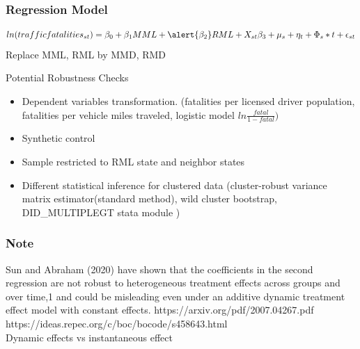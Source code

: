 \documentclass{beamer}
\begin{document}
\begin{frame}
\frametitle{Regression Model}

$$ ln(traffic fatalities_{st}) = \beta_0 + \beta_1 MML + \alert{\beta_2} RML + X_{st} \beta_3 + \mu_s + \eta_t  +\Phi_s *t +\epsilon_{st}$$
Replace MML, RML by MMD, RMD


\end{frame}

\begin{frame} {Potential Robustness Checks}
\begin{itemize}

	\item Dependent variables transformation. (fatalities per licensed driver population, fatalities per vehicle miles traveled, logistic model $ln\frac{fatal}{1- fatal} )$
	
	\item Synthetic control
	
	\item Sample restricted to RML state and neighbor states
	
	\item Different statistical inference for clustered data (cluster-robust variance matrix estimator(standard method), wild cluster bootstrap, DID\_MULTIPLEGT stata module )
\end{itemize}


\end{frame}

\begin{frame}
\frametitle{Note}
Sun and Abraham (2020) have shown that the coefficients in the second regression are not robust to heterogeneous treatment effects across groups and over time,1 and could be misleading even under an additive dynamic treatment effect model with constant effects.  https://arxiv.org/pdf/2007.04267.pdf  \\
https://ideas.repec.org/c/boc/bocode/s458643.html \\ 

Dynamic effects vs instantaneous effect

\end{frame}
\end{document}
